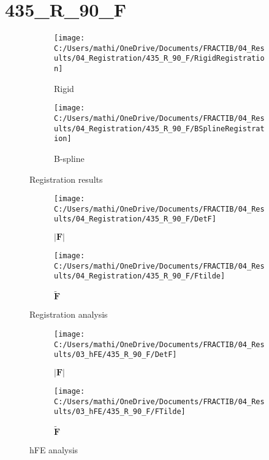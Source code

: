 \documentclass{article}%
\begin{document}
%
\newpage%
\section*{435\_R\_90\_F}%
\label{sec:435R90F}%


\begin{figure}[h!]%
\begin{subfigure}[b]{0.5\linewidth}%
\texttt{[image: C:/Users/mathi/OneDrive/Documents/FRACTIB/04\_Results/04\_Registration/435\_R\_90\_F/RigidRegistration]}%
\caption{Rigid}%
\end{subfigure}%
\begin{subfigure}[b]{0.5\linewidth}%
\texttt{[image: C:/Users/mathi/OneDrive/Documents/FRACTIB/04\_Results/04\_Registration/435\_R\_90\_F/BSplineRegistration]}%
\caption{B{-}spline}%
\end{subfigure}%
\caption{Registration results}%
\end{figure}

%


\begin{figure}[h!]%
\begin{subfigure}[b]{0.5\linewidth}%
\texttt{[image: C:/Users/mathi/OneDrive/Documents/FRACTIB/04\_Results/04\_Registration/435\_R\_90\_F/DetF]}%
\caption{$|\mathbf{F}|$}%
\end{subfigure}%
\begin{subfigure}[b]{0.5\linewidth}%
\texttt{[image: C:/Users/mathi/OneDrive/Documents/FRACTIB/04\_Results/04\_Registration/435\_R\_90\_F/Ftilde]}%
\caption{$\tilde{\mathbf{F}}$}%
\end{subfigure}%
\caption{Registration analysis}%
\end{figure}

%


\begin{figure}[h!]%
\begin{subfigure}[b]{0.5\linewidth}%
\texttt{[image: C:/Users/mathi/OneDrive/Documents/FRACTIB/04\_Results/03\_hFE/435\_R\_90\_F/DetF]}%
\caption{$|\mathbf{F}|$}%
\end{subfigure}%
\begin{subfigure}[b]{0.5\linewidth}%
\texttt{[image: C:/Users/mathi/OneDrive/Documents/FRACTIB/04\_Results/03\_hFE/435\_R\_90\_F/FTilde]}%
\caption{$\tilde{\mathbf{F}}$}%
\end{subfigure}%
\caption{hFE analysis}%
\end{figure}
\end{document}
